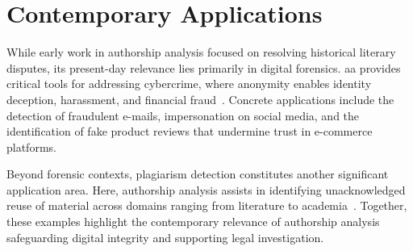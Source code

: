 \section{Contemporary Applications} %

While early work in authorship analysis focused on resolving historical literary disputes, its present-day relevance lies primarily in digital forensics. %
\ac{aa} provides critical tools for addressing cybercrime, where anonymity enables identity deception, harassment, and financial fraud~\citep{abbasi_writeprints_2008,uchendu_authorship_2020,bhattacharjee_fighting_2024}. 
Concrete applications include the detection of fraudulent e-mails, impersonation on social media, and the identification of fake product reviews that undermine trust in e-commerce platforms. 

Beyond forensic contexts, plagiarism detection constitutes another significant application area. 
Here, authorship analysis assists in identifying unacknowledged reuse of material across domains ranging from literature to academia~\citep{neal_surveying_2018}. 
Together, these examples highlight the contemporary relevance of authorship analysis safeguarding digital integrity and supporting legal investigation.
